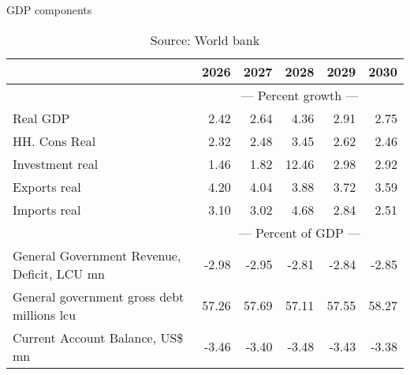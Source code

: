 \documentclass{article}
\begin{document}
\begin{table}[ht]
\caption{GDP components}
\begin{tabular}{lrrrrr}
\toprule
 & 2026 & 2027 & 2028 & 2029 & 2030 \\
\midrule
&\multicolumn{5}{c}{{---  Percent growth ---}}                          \\
Real GDP & 2.42 & 2.64 & 4.36 & 2.91 & 2.75 \\
HH. Cons Real & 2.32 & 2.48 & 3.45 & 2.62 & 2.46 \\
Investment real & 1.46 & 1.82 & 12.46 & 2.98 & 2.92 \\
Exports real & 4.20 & 4.04 & 3.88 & 3.72 & 3.59 \\
Imports real & 3.10 & 3.02 & 4.68 & 2.84 & 2.51 \\
&\multicolumn{5}{c}{{---  Percent of GDP ---}}                          \\
General Government Revenue, Deficit, LCU mn & -2.98 & -2.95 & -2.81 & -2.84 & -2.85 \\
General government gross debt millions lcu & 57.26 & 57.69 & 57.11 & 57.55 & 58.27 \\
Current Account Balance, US\$ mn & -3.46 & -3.40 & -3.48 & -3.43 & -3.38 \\
\bottomrule
\end{tabular}
\caption*{Source: World bank }
\end{table}
\end{document}
